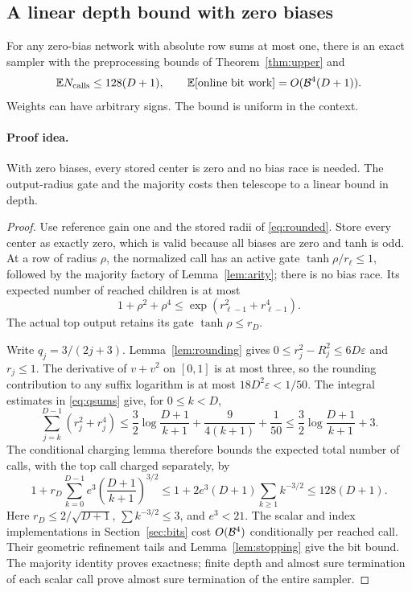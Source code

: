 \subsection{A linear depth bound with zero biases}

\begin{theorem}
\label{thm:zero-bias-linear}
For any zero-bias network with absolute row sums at most one, there
is an exact sampler with the preprocessing bounds of
Theorem~\ref{thm:upper} and
\[
 \mathbb E N_{\rm calls}\le128(D+1),\qquad
 \mathbb E[\hbox{online bit work}]=O(\mathcal B^4(D+1)).
\]
Weights can have arbitrary signs. The bound is uniform in the context.
\end{theorem}
\paragraph{Proof idea.}
With zero biases, every stored center is zero and no bias race is needed.
The output-radius gate and the majority costs then telescope to a linear
bound in depth.

\begin{proof}
Use reference gain one and the stored radii of
\eqref{eq:rounded}. Store every center as exactly zero, which is
valid because all biases are zero and tanh is odd. At a row of
radius $\rho$, the normalized call has an active gate
$\tanh\rho/r_\ell\le1$, followed by the majority factory of
Lemma~\ref{lem:arity}; there is no bias race. Its expected number
of reached children is at most
\[
 1+\rho^2+\rho^4\le\exp(r_{\ell-1}^2+r_{\ell-1}^4).
\]
The actual top output retains its gate $\tanh\rho\le r_D$.

Write $q_j=3/(2j+3)$. Lemma~\ref{lem:rounding} gives
$0\le r_j^2-R_j^2\le6D\varepsilon$ and $r_j\le1$.
The derivative of $v+v^2$ on $[0,1]$ is at most three, so the
rounding contribution to any suffix logarithm is at most
$18D^2\varepsilon<1/50$.
The integral estimates in \eqref{eq:qsums} give, for $0\le k<D$,
\[
 \sum_{j=k}^{D-1}(r_j^2+r_j^4)
 \le \frac32\log\frac{D+1}{k+1}+\frac9{4(k+1)}+\frac1{50}
 \le \frac32\log\frac{D+1}{k+1}+3.
\]
The conditional charging lemma therefore bounds the expected total
number of calls, with the top call charged separately, by
\[
 1+r_D\sum_{k=0}^{D-1}
       e^3\left(\frac{D+1}{k+1}\right)^{3/2}
 \le1+2e^3(D+1)\sum_{k\ge1}k^{-3/2}
 \le128(D+1).
\]
Here $r_D\le2/\sqrt{D+1}$, $\sum k^{-3/2}\le3$, and $e^3<21$.
The scalar and index implementations in Section~\ref{sec:bits}
cost $O(\mathcal B^4)$ conditionally per reached call. Their geometric
refinement tails and Lemma~\ref{lem:stopping} give the bit bound.
The majority identity proves exactness; finite depth and almost
sure termination of each scalar call prove almost sure termination
of the entire sampler.
\end{proof}
